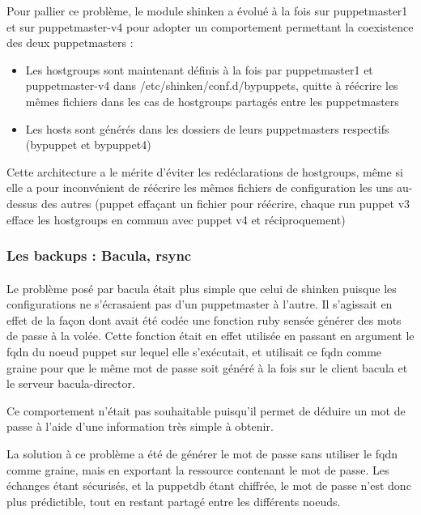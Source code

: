 \documentclass[14 pt,a4paper]{extreport}
\begin{document}
Pour pallier ce problème, le module shinken a évolué à la fois sur puppetmaster1 et sur puppetmaster-v4 pour adopter un comportement permettant la coexistence des deux puppetmasters :

\begin{itemize}
	\item Les hostgroups sont maintenant définis à la fois par puppetmaster1 et puppetmaster-v4 dans /etc/shinken/conf.d/bypuppets, quitte à réécrire les mêmes fichiers dans les cas de hostgroups partagés entre les puppetmasters
	\item Les hosts sont générés dans les dossiers de leurs puppetmasters respectifs (bypuppet et bypuppet4)
\end{itemize}

Cette architecture a le mérite d'éviter les redéclarations de hostgroups, même si elle a pour inconvénient de réécrire les mêmes fichiers de configuration les uns au-dessus des autres (puppet effaçant un fichier pour réécrire, chaque run puppet v3 efface les hostgroups en commun avec puppet v4 et réciproquement)

\subsubsection{Les backups : Bacula, rsync}

\paragraph*{}Le problème posé par bacula était plus simple que celui de shinken puisque les configurations ne s'écrasaient pas d'un puppetmaster à l'autre. Il s'agissait en effet de la façon dont avait été codée une fonction ruby sensée générer des mots de passe à la volée. Cette fonction était en effet utilisée en passant en argument le fqdn du noeud puppet sur lequel elle s'exécutait, et utilisait ce fqdn comme graine pour que le même mot de passe soit généré à la fois sur le client bacula et le serveur bacula-director.

Ce comportement n'était pas souhaitable puisqu'il permet de déduire un mot de passe à l'aide d'une information très simple à obtenir.

La solution à ce problème a été de générer le mot de passe sans utiliser le fqdn comme graine, mais en exportant la ressource contenant le mot de passe. Les échanges étant sécurisés, et la puppetdb étant chiffrée, le mot de passe n'est donc plus prédictible, tout en restant partagé entre les différents noeuds.
\end{document}
